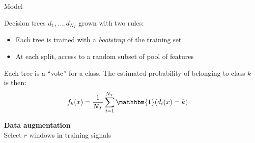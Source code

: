\begin{frame}{Model}{}
\begin{minipage}[t]{0.45\linewidth}
    \vspace{0pt}
    \begin{tcolorbox}[title=Random forest,size=title,boxrule=0.2pt]
        Decision trees $d_1,...,d_{N_T}$ grown with two rules:
        \begin{itemize}
            \item Each tree is trained with a \emph{bootstrap} of the training set
            \item At each split, access to a random subset of pool of features
        \end{itemize}
        Each tree is a ``vote'' for a class.
        The estimated probability of belonging to class $k$ is then:
        \begin{equation*}
            f_{k}(x) = \frac{1}{N_T}\sum_{i=1}^{N_T}\mathbbm{1}(d_i(x)=k)
        \end{equation*}

    \end{tcolorbox}
\end{minipage}\hfill
\begin{minipage}[t]{0.52\linewidth}
    \vspace{0pt}
    \pause
    \centering\textbf{Data augmentation}\\
    Select $r$ windows in training signals

    \centering
    

\end{minipage}
\end{frame}
